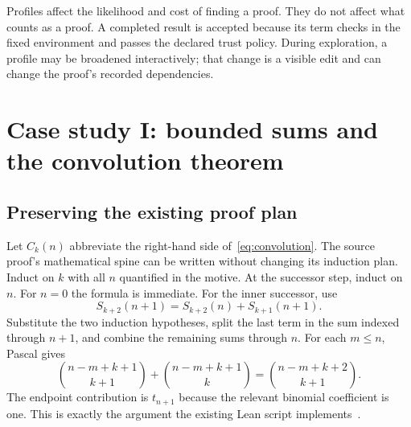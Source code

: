 \documentclass[11pt,letterpaper]{article}
\theoremstyle{definition}
\theoremstyle{remark}
\begin{document}
Profiles affect the likelihood and cost of finding a proof. They do not affect what counts as a proof. A completed result is accepted because its term checks in the fixed environment and passes the declared trust policy. During exploration, a profile may be broadened interactively; that change is a visible edit and can change the proof's recorded dependencies.

\section{Case study I: bounded sums and the convolution theorem}
\label{sec:prefix-case}
\subsection{Preserving the existing proof plan}
Let $C_k(n)$ abbreviate the right-hand side of~\eqref{eq:convolution}. The source proof's mathematical spine can be written without changing its induction plan. Induct on $k$ with all $n$ quantified in the motive. At the successor step, induct on $n$. For $n=0$ the formula is immediate. For the inner successor, use
\begin{equation}
 S_{k+2}(n+1)=S_{k+2}(n)+S_{k+1}(n+1).
 \label{eq:prefix-step}
\end{equation}
Substitute the two induction hypotheses, split the last term in the sum indexed through $n+1$, and combine the remaining sums through $n$. For each $m\le n$, Pascal gives
\begin{equation}
 \binom{n-m+k+1}{k+1}+\binom{n-m+k+1}{k}
 =\binom{n-m+k+2}{k+1}.
 \label{eq:pascal-instance}
\end{equation}
The endpoint contribution is $t_{n+1}$ because the relevant binomial coefficient is one. This is exactly the argument the existing Lean script implements~\cite{prefix}.
\end{document}
